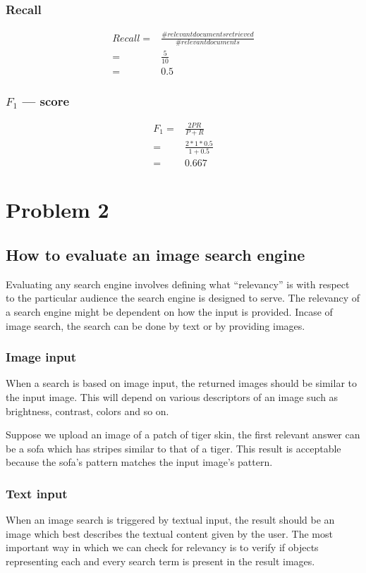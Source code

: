\documentclass{article}
\begin{document}
\subsubsection{Recall}
\begin{align*}
  Recall =& \frac{\#relevant documents retrieved}{\#relevant documents}\\
  =& \frac{5}{10} \\
  =& 0.5
\end{align*}

\subsubsection{$F_{1}$ --- score}
\begin{align*}
  F_{1} =& \frac{2PR}{P+R} \\
  =& \frac{2 * 1 * 0.5}{1 + 0.5} \\
  =& 0.667
\end{align*}

\section{Problem 2}
\subsection{How to evaluate an image search engine}
Evaluating any search engine involves defining what ``relevancy'' is with respect to the particular audience the search engine is designed to serve.
The relevancy of a search engine might be dependent on how the input is provided.  Incase of image search, the search can be done by text or by providing images.

\subsubsection{Image input}
When a search is based on image input, the returned images should be similar to the input image.  This will depend on various descriptors of an image such as brightness, contrast, colors and so on.

Suppose we upload an image of a patch of tiger skin, the first relevant answer can be a sofa which has stripes similar to that of a tiger.  This result is acceptable because the sofa's pattern matches the input image's pattern.

\subsubsection{Text input}
When an image search is triggered by textual input, the result should be an image which best describes the textual content given by the user.
The most important way in which we can check for relevancy is to verify if objects representing each and every search term is present in the result images.  
\end{document}
